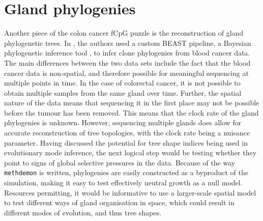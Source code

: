 \section{Gland phylogenies}
Another piece of the colon cancer fCpG puzzle is the reconstruction of gland
phylogenetic trees. In \cite{gabbutt_evolutionary_2023}, the authors used a
custom BEAST pipeline, a Bayesian phylogenetic inference tool
\cite{bouckaert_beast_2019}, to infer clone phylogenies from blood cancer data.
The main differences between the two data sets include the fact that the blood
cancer data is non-spatial, and therefore possible for meaningful sequencing at
multiple points in time. In the case of colorectal cancer, it is not possible
to obtain multiple samples from the same gland over time. Further, the spatial
nature of the data means that sequencing it in the first place may not be
possible before the tumour has been removed. This means that the clock rate of
the gland phylogenies is unknown. However, sequencing multiple glands does
allow for accurate reconstruction of tree topologies, with the clock rate being
a nuisance parameter. Having discussed the potential for tree shape indices
being used in evolutionary mode inference, the next logical step would be
testing whether they point to signs of global selective pressures in the data.
Because of the way \texttt{methdemon} is written, phylogenies are easily
constructed as a byproduct of the simulation, making it easy to test
effectively neutral growth as a null model. Resources permitting, it would be
informative to use a larger-scale spatial model to test different ways of gland
organisation in space, which could result in different modes of evolution, and
thus tree shapes.

